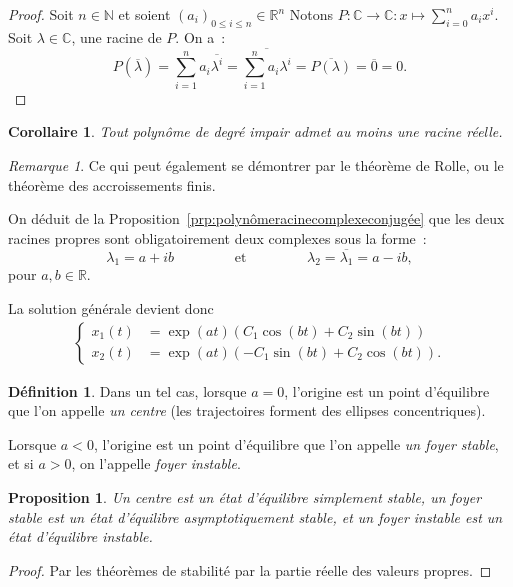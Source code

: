 \documentclass{article}
\newtheorem{prp}[thm]{Proposition}
\newtheorem{cor}[thm]{Corollaire}
\theoremstyle{definition}
\newtheorem{déf}[thm]{Définition}
\theoremstyle{remark}
\newtheorem*{rmq}{Remarque}
\newcommand{\N}{\mathbb N}
\newcommand{\R}{\mathbb R}
\newcommand{\C}{\mathbb C}
\begin{document}
	\begin{proof} Soit $n \in \N$ et soient $(a_i)_{0 \leq i \leq n} \in \R^n$ Notons $P : \C \to \C : x \mapsto \sum_{i=0}^na_ix^i$.
	Soit $\lambda \in \C$, une racine de $P$. On a~:
	\[P(\overline \lambda) = \sum_{i=1}^na_i\overline {\lambda^i} = \overline {\sum_{i=1}^na_i\lambda^i} = \overline {P(\lambda)} = \overline 0 = 0.\]
	\end{proof}

	\begin{cor} Tout polynôme de degré impair admet au moins une racine réelle.
	\end{cor}

	\begin{rmq} Ce qui peut également se démontrer par le théorème de Rolle, ou le théorème des accroissements finis.
	\end{rmq}

	On déduit de la Proposition~\ref{prp:polynômeracinecomplexeconjugée} que les deux racines propres sont obligatoirement deux complexes sous la forme~:
	\[\lambda_1 = a+ib \qquad\qquad \text{ et } \qquad\qquad \lambda_2 = \overline {\lambda_1} = a - ib,\]
	pour $a, b \in \R$.

	La solution générale devient donc
	\begin{align}\label{eq:solgénéralevalproprescomplexes}
		\begin{cases}
			x_1(t) &= \exp(at)\left( C_1\cos(bt) + C_2\sin(bt)\right) \\
			x_2(t) &= \exp(at)\left(-C_1\sin(bt) + C_2\cos(bt)\right).
		\end{cases}
	\end{align}

	\begin{déf} Dans un tel cas, lorsque $a = 0$, l'origine est un point d'équilibre que l'on appelle \textit{un centre} (les trajectoires forment des ellipses
	concentriques).

	Lorsque $a < 0$, l'origine est un point d'équilibre que l'on appelle \textit{un foyer stable}, et si $a > 0$, on l'appelle \textit{foyer instable}.
	\end{déf}

	\begin{prp} Un centre est un état d'équilibre simplement stable, un foyer stable est un état d'équilibre asymptotiquement stable, et un foyer instable est
	un état d'équilibre instable.
	\end{prp}

	\begin{proof} Par les théorèmes de stabilité par la partie réelle des valeurs propres.
	\end{proof}
\end{document}
